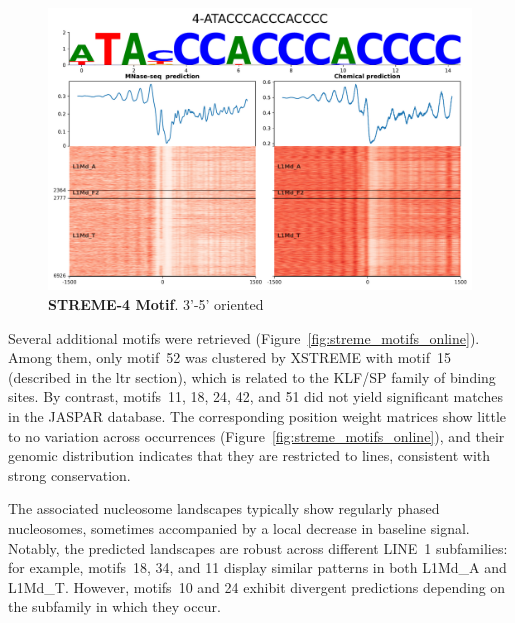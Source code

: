 \documentclass[11pt]{book}
\begin{document}
\begin{figure}[htbp]
    \centering
    \includegraphics[width=\textwidth]{Figures/Results/xstreme_onrep_meta_hm/4-ATACCCACCCACCCC.pdf}
    \caption{\textbf{STREME-4 Motif}. 3'-5' oriented}
    \label{fig:streme4}
\end{figure}

Several additional motifs were retrieved (Figure~\ref{fig:streme_motifs_online}). Among them, only motif~52 was clustered by XSTREME with motif~15 (described in the \gls{ltr} section), which is related to the KLF/SP family of binding sites. By contrast, motifs~11, 18, 24, 42, and 51 did not yield significant matches in the JASPAR database. The corresponding position weight matrices show little to no variation across occurrences (Figure~\ref{fig:streme_motifs_online}), and their genomic distribution indicates that they are restricted to \glspl{line}, consistent with strong conservation.

The associated nucleosome landscapes typically show regularly phased nucleosomes, sometimes accompanied by a local decrease in baseline signal. Notably, the predicted landscapes are robust across different LINE~1 subfamilies: for example, motifs~18, 34, and 11 display similar patterns in both L1Md\_A and L1Md\_T. However, motifs~10 and 24 exhibit divergent predictions depending on the subfamily in which they occur.
\end{document}
